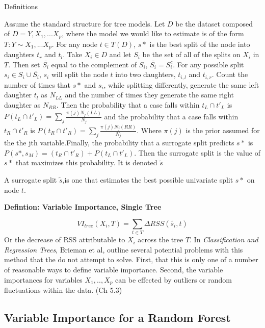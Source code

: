 \documentclass[12pt,twoside]{reedthesis}
\begin{document}
  Definitions
  
  Assume the standard structure for tree models. Let \(D\) be the dataset
  composed of \(D = {Y, X_1,...X_p}\), where the model we would like to
  estimate is of the form \(T: Y \sim X_1,...X_p\). For any node
  \(t \in T(D)\), \(s*\) is the best split of the node into daughters
  \(t_r\) and \(t_l\). Take \(X_i \in D\) and let \(S_i\) be the set of
  all of the splits on \(X_i\) in \(T\). Then set \(\bar{S_i}\) equal to
  the complement of \(S_i\), \(\bar{S_i} = S_i^c\). For any possible split
  \(s_i \in S_i \cup \bar{S_i}\), \(s_i\) will split the node \(t\) into
  two daughters, \(t_{i,l}\) and \(t_{i,r}\). Count the number of times
  that \(s*\) and \(s_i\), while splitting differently, generate the same
  left daughter \(t_{l}\) as \(N_{LL}\) and the number of times they
  generate the same right daughter as \(N_{RR}\). Then the probability
  that a case falls within \(t_L \cap t'_L\) is
  \(P(t_L \cap t'_L) = \sum_j \frac{\pi(j) N_j(LL)}{N_j}\) and the
  probability that a case falls within \(t_R \cap t'_R\) is
  \(P(t_R \cap t'_R) = \sum_j \frac{\pi(j) N_j(RR)}{N_j}\). Where
  \(\pi(j)\) is the prior assumed for the the jth variable.Finally, the
  probability that a surrogate split predicts \(s*\) is
  \(P(s*, s_M) = (t_R \cap t'_R) + P(t_L \cap t'_L)\). Then the surrogate
  split is the value of \(s*\) that maximizes this probability. It is
  denoted \(\tilde{s}\)
  
  A surrogate split \(\tilde{s}\),is one that estimates the best possible
  univariate split \(s*\) on node \(t\).
  
  \textbf{Defintion: Variable Importance, Single Tree}
  
  \[VI_{tree}(X_i, T) = \sum_{t \in T} \Delta RSS(\tilde{s_i}, t)\] Or the
  decrease of RSS attributable to \(X_i\) across the tree \(T\). In
  \emph{Classification and Regression Trees}, Brieman et al, outline
  several potential problems with this method that the do not attempt to
  solve. First, that this is only one of a number of reasonable ways to
  define variable importance. Second, the variable importances for
  variables \(X_1,..,X_p\) can be effected by outliers or random
  fluctuations within the data. (Ch 5.3)
  
  \subsection{Variable Importance for a Random
  Forest}\label{variable-importance-for-a-random-forest}
  
\end{document}
